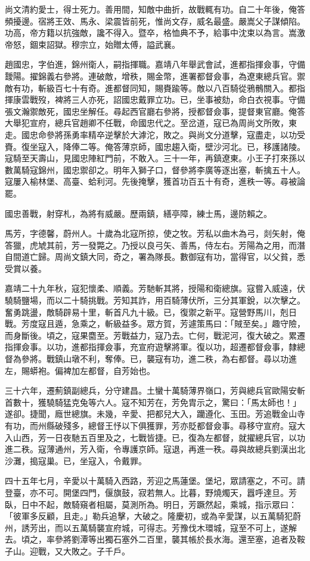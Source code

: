 \begin{pinyinscope}
尚文清約愛士，得士死力。善用間，知敵中曲折，故戰輒有功。自二十年後，俺答頻擾邊。宿將王效、馬永、梁震皆前死，惟尚文存，威名最盛。嚴嵩父子謀傾陷。功高，帝方籍以抗強敵，讒不得入。暨卒，格恤典不予，給事中沈束以為言。嵩激帝怒，錮束詔獄。穆宗立，始贈太傅，謚武襄。

趙國忠，字伯進，錦州衛人，嗣指揮職。嘉靖八年舉武會試，進都指揮僉事，守備靉陽。擢錦義右參將。連破敵，增秩，賜金幣，進署都督僉事，為遼東總兵官。禦敵有功，斬級百七十有奇。進都督同知，賜賚踰等。敵以八百騎從鴉鶻關入。都指揮康雲戰歿，裨將三人亦死，詔國忠戴罪立功。已，坐事被劾，命白衣視事。守備張文瀚禦敵死，國忠坐解任。尋起西官廳右參將，授都督僉事，提督東官廳。俺答大舉犯宣府，總兵官趙卿不任戰，命國忠代之。至岔道，寇已為周尚文所敗，東走。國忠命參將孫勇率精卒逆擊於大滹沱，敗之。與尚文分道擊，寇盡走，以功受賚。復坐寇入，降俸二等。俺答薄京師，國忠趨入衛，壁沙河北。已，移護諸陵。寇騎至天壽山，見國忠陣紅門前，不敢入。三十一年，再鎮遼東。小王子打來孫以數萬騎寇錦州，國忠禦卻之。明年入獅子口，督參將李廣等逐出塞，斬擒五十人。寇屢入榆林堡、高臺、蛤利河。先後掩擊，獲首功百五十有奇，進秩一等。尋被論罷。

國忠善戰，射穿札，為將有威嚴。歷兩鎮，繕亭障，練士馬，邊防賴之。

馬芳，字德馨，蔚州人。十歲為北寇所掠，使之牧。芳私以曲木為弓，剡矢射，俺答獵，虎虓其前，芳一發斃之。乃授以良弓矢、善馬，侍左右。芳陽為之用，而潛自間道亡歸。周尚文鎮大同，奇之，署為隊長。數御寇有功，當得官，以父貧，悉受賞以養。

嘉靖二十九年秋，寇犯懷柔、順義。芳馳斬其將，授陽和衛總旗。寇嘗入威遠，伏驍騎鹽場，而以二十騎挑戰。芳知其詐，用百騎薄伏所，三分其軍銳，以次擊之。奮勇跳盪，敵騎辟易十里，斬首凡九十級。已，復禦之新平。寇營野馬川，剋日戰。芳度寇且遁，急乘之，斬級益多。眾方賀，芳遽策馬曰：「賊至矣。」趣守險，而身斷後。頃之，寇果麕至。芳戰益力，寇乃去。亡何，戰泥河，復大破之。累遷指揮僉事。以功，進都指揮僉事，充宣府遊擊將軍。復以功，超遷都督僉事，隸總督為參將。戰鎮山墩不利，奪俸。已，襲寇有功，進二秩，為右都督。尋以功進左，賜蟒袍。偏裨加左都督，自芳始也。

三十六年，遷薊鎮副總兵，分守建昌。土蠻十萬騎薄界嶺口，芳與總兵官歐陽安斬首數十，獲驍騎猛克兔等六人。寇不知芳在，芳免胄示之，驚曰：「馬太師也！」遂卻。捷聞，廕世總旗。未幾，辛愛、把都兒大入，躪遵化、玉田。芳追戰金山寺有功，而州縣破殘多，總督王忬以下俱獲罪，芳亦貶都督僉事。尋移守宣府。寇大入山西，芳一日夜馳五百里及之，七戰皆捷。已，復為左都督，就擢總兵官，以功進二秩。寇薄通州，芳入衛，令專護京師。寇退，再進一秩。尋與故總兵劉漢出北沙灘，搗寇巢。已，坐寇入，令戴罪。

四十五年七月，辛愛以十萬騎入西路，芳迎之馬蓮堡。堡圮，眾請塞之，不可。請登臺，亦不可。開堡四門，偃旗鼓，寂若無人。比暮，野燒燭天，囂呼達旦。芳臥，日中不起，敵騎窺者相屬，莫測所為。明日，芳蹶然起，乘城，指示眾曰：「彼軍多反顧，且走。」勒兵追擊，大破之。隆慶初，或為辛愛謀，以五萬騎犯蔚州，誘芳出，而以五萬騎襲宣府城，可得志。芳豫伐木環城，寇至不可上，遂解去。頃之，率參將劉潭等出獨石塞外二百里，襲其帳於長水海。還至塞，追者及鞍子山。迎戰，又大敗之。子千戶。


\end{pinyinscope}
